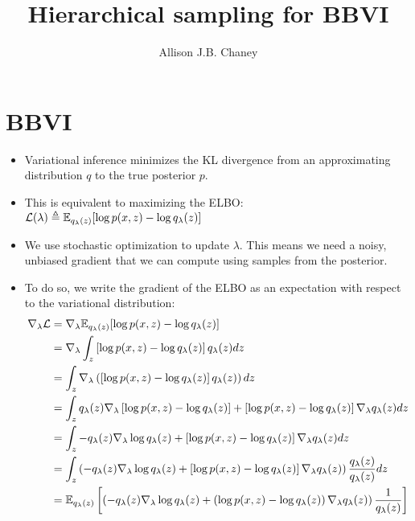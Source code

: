 





\title{Hierarchical sampling for BBVI}

\author{Allison J.B. Chaney}

\maketitle

\section{BBVI}

\begin{itemize}
\item Variational inference minimizes the KL divergence from an approximating distribution $q$ to the true posterior $p$.
\item This is equivalent to maximizing the ELBO: $\mathcal{L}(\lambda) \triangleq \mathbb{E}_{q_\lambda(z)}[\log p(x,z) - \log q_\lambda(z)]$
\item We use stochastic optimization to update $\lambda$.  This means we need a noisy, unbiased gradient that we can compute using samples from the posterior.
\item To do so, we write the gradient of the ELBO as an expectation with respect to the variational distribution:
\begin{align*}
\nabla_\lambda\mathcal{L} &= \nabla_\lambda \E_{q_\lambda(z)}[\log p(x,z) - \log q_\lambda(z)] \\
&= \nabla_\lambda \int_z \left[\log p(x,z) - \log q_\lambda(z)\right] q_\lambda(z) dz \\
&= \int_z \nabla_\lambda \left(\left[\log p(x,z) - \log q_\lambda(z)\right] q_\lambda(z) \right) dz \\
&= \int_z q_\lambda(z) \nabla_\lambda \left[\log p(x,z) - \log q_\lambda(z)\right] + \left[\log p(x,z) - \log q_\lambda(z)\right] \nabla_\lambda q_\lambda(z) dz \\
&= \int_z - q_\lambda(z) \nabla_\lambda \log q_\lambda(z) + \left[\log p(x,z) - \log q_\lambda(z)\right] \nabla_\lambda q_\lambda(z) dz \\
&= \int_z \left( - q_\lambda(z) \nabla_\lambda \log q_\lambda(z) + \left[\log p(x,z) - \log q_\lambda(z)\right] \nabla_\lambda q_\lambda(z) \right) \frac{q_\lambda(z)}{q_\lambda(z)} dz \\
&= \E_{q_\lambda(z)}\left[ \left( - q_\lambda(z) \nabla_\lambda \log q_\lambda(z) + \left(\log p(x,z) - \log q_\lambda(z)\right) \nabla_\lambda q_\lambda(z) \right) \frac{1}{q_\lambda(z)} \right] \\

\end{align*}
\end{itemize}
